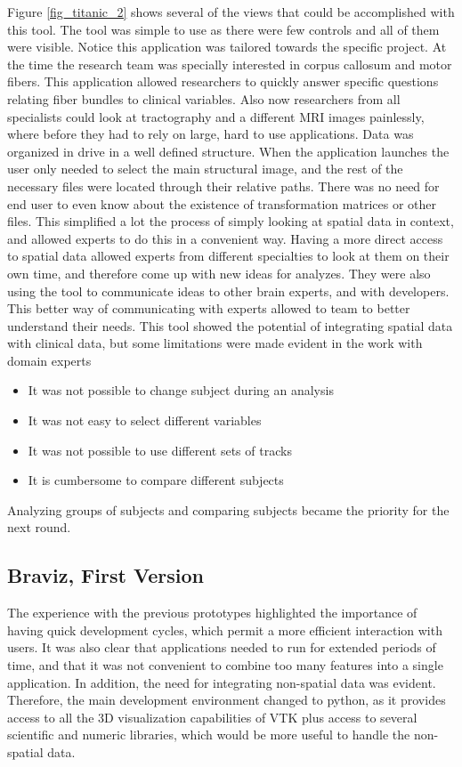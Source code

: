 Figure \ref{fig_titanic_2} shows several of the views that could be accomplished with this tool.
The tool was simple to use as there were few controls and all of them were visible. Notice this application was tailored towards the specific project. At the time the research team was specially interested in corpus callosum and motor fibers. This application allowed researchers to quickly answer specific questions relating fiber bundles to clinical variables. Also now researchers from all specialists could look at tractography and a different MRI images painlessly, where before they had to rely on large, hard to use applications. Data was organized in drive in a well defined structure. When the application launches the user only needed to select the main structural image, and the rest of the necessary files were located through their relative paths. There was no need for end user to even know about the existence of transformation matrices or other files. This simplified a lot the process of simply looking at spatial data in context, and allowed experts to do this in a convenient way. Having a more direct access to spatial data allowed experts from different specialties to look at them on their own time, and therefore come up with new ideas for analyzes. They were also using the tool to communicate ideas to other brain experts, and with developers. This better way of communicating with experts allowed to team to better understand their needs. This tool showed the potential of integrating spatial data with clinical data, but some limitations were made evident in the work with domain experts
\begin{itemize}
\item It was not possible to change subject during an analysis
\item It was not easy to select different variables
\item It was not possible to use different sets of tracks
\item It is cumbersome to compare different subjects
\end{itemize}

Analyzing groups of subjects and comparing subjects became the priority for the next round.

\subsection{Braviz, First Version}


The experience with the previous prototypes highlighted the importance of having quick development cycles, which permit a more efficient interaction with users. It was also clear that applications needed to run for extended periods of time, and that it was not convenient to combine too many features into a single application. In addition, the need for integrating non-spatial data was evident. Therefore, the main development environment changed to python, as it provides access to all the 3D visualization capabilities of VTK plus access to several scientific and numeric libraries, which would be more useful to handle the non-spatial data.

